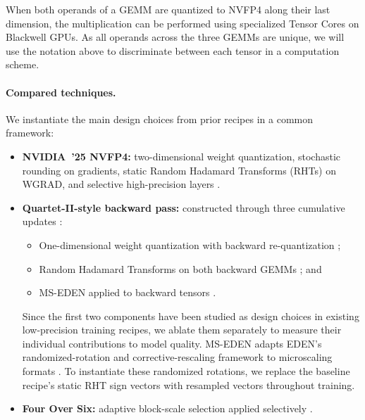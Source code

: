 When both operands of a GEMM are quantized to NVFP4 along their last dimension, the multiplication can be performed using specialized Tensor Cores on Blackwell GPUs. As all operands across the three GEMMs are unique, we will use the notation above to discriminate between each tensor in a computation scheme.

\paragraph{Compared techniques.}
We instantiate the main design choices from prior recipes in a common framework:

\begin{itemize}
    \item \textbf{NVIDIA~'25 NVFP4:} two-dimensional weight quantization, stochastic rounding on gradients, static Random Hadamard Transforms (RHTs) on WGRAD, and selective high-precision layers \citep{nvidia2025pretraining}.

    \item \textbf{Quartet-II-style backward pass:} constructed through three cumulative updates \cite{panferov2026quartetii}:
    \begin{itemize}
        \item One-dimensional weight quantization with backward re-quantization \citep{chen2025oscillationreducedmxfp4trainingvision, castro2025quartet, chen2025tetrajet};
        \item Random Hadamard Transforms on both backward GEMMs \citep{tseng2025mxfp4, castro2025quartet, chen2025tetrajet}; and
        \item MS-EDEN applied to backward tensors \citep{panferov2026quartetii}.
    \end{itemize}
    
    Since the first two components have been studied as design choices in existing low-precision training recipes, we ablate them separately to measure their individual contributions to model quality. MS-EDEN adapts EDEN’s randomized-rotation and corrective-rescaling framework to microscaling formats \citep{vargaftik2022edencommunicationefficientrobustdistributed, panferov2026quartetii}. To instantiate these randomized rotations, we replace the baseline recipe's static RHT sign vectors with resampled vectors throughout training.

    \item \textbf{Four Over Six:} adaptive block-scale selection applied selectively \citep{cook2025fouroversix}.
\end{itemize}


